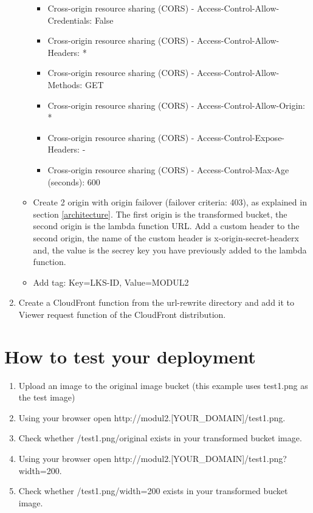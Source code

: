 \documentclass{article}
\begin{document}
\begin{enumerate}
\begin{itemize}
\begin{itemize}
      \item Cross-origin resource sharing (CORS) - Access-Control-Allow-Credentials: False
      \item Cross-origin resource sharing (CORS) - Access-Control-Allow-Headers: *
      \item Cross-origin resource sharing (CORS) - Access-Control-Allow-Methods: GET
      \item Cross-origin resource sharing (CORS) - Access-Control-Allow-Origin: *
      \item Cross-origin resource sharing (CORS) - Access-Control-Expose-Headers: -
      \item Cross-origin resource sharing (CORS) - Access-Control-Max-Age (seconds): 600
    \end{itemize}
    \item Create 2 origin with origin failover (failover criteria: 403), as explained in section \ref{architecture}. The first origin is the transformed bucket, the second origin is the lambda function URL. Add a custom header to the second origin, the name of the custom header is x-origin-secret-headerx and, the value is the secrey key you have previously added to the lambda function.
    \item Add tag: Key=LKS-ID, Value=MODUL2
  \end{itemize}
  \item Create a CloudFront function from the url-rewrite directory and add it to Viewer request function of the CloudFront distribution.
\end{enumerate}
\section{How to test your deployment}
\begin{enumerate}
  \item Upload an image to the original image bucket (this example uses test1.png as the test image)
  \item Using your browser open http://modul2.[YOUR\_DOMAIN]/test1.png.
  \item Check whether /test1.png/original exists in your transformed bucket image.
  \item Using your browser open http://modul2.[YOUR\_DOMAIN]/test1.png?width=200.
  \item Check whether /test1.png/width=200 exists in your transformed bucket image.
\end{enumerate}
\end{document}

